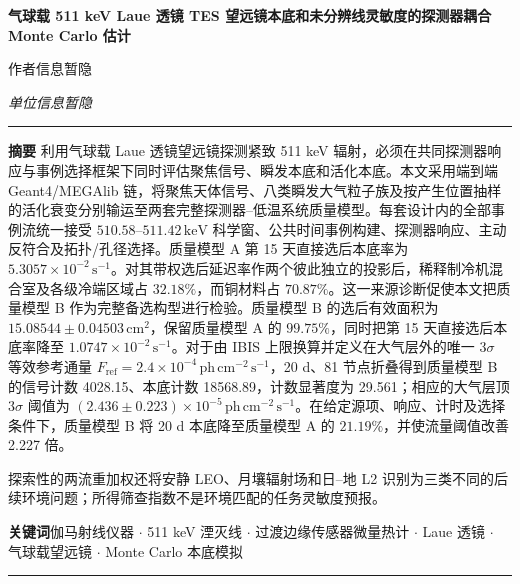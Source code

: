 \documentclass[11pt]{article}
\newcommand{\revblue}[1]{\textcolor{revisionblue}{#1}}
\newcommand{\keV}{\,\mathrm{keV}}
\newcommand{\phcms}{\,\mathrm{ph\,cm^{-2}\,s^{-1}}}
\newcommand{\cps}{\,\mathrm{s^{-1}}}
\newcommand{\fref}{F_{\mathrm{ref}}}
\begin{document}
\thispagestyle{fancy}
\begin{flushleft}
{\LARGE\bfseries 气球载 511 keV Laue 透镜 TES 望远镜本底和未分辨线灵敏度的探测器耦合 Monte Carlo 估计 \par}
\vspace{1.1em}
{\large 作者信息暂隐\par}
\vspace{0.3em}
{\normalsize\itshape 单位信息暂隐\par}
\end{flushleft}
\vspace{0.7em}
\noindent\rule{\textwidth}{0.4pt}
\vspace{0.5em}

\noindent\textbf{摘要}\hspace{0.7em}
利用气球载 Laue 透镜望远镜探测紧致 511 keV 辐射，必须在共同探测器响应与事例选择框架下同时评估聚焦信号、瞬发本底和活化本底。本文采用端到端 Geant4/MEGAlib 链，将聚焦天体信号、\revblue{八类瞬发大气粒子族}及按产生位置抽样的活化衰变分别输运至两套完整探测器--低温系统质量模型。每套设计内的全部事例流统一接受 $510.58$--$511.42\keV$ 科学窗、公共时间事例构建、探测器响应、主动反符合及拓扑/孔径选择。质量模型 A 第 15 天直接选后本底率为 $5.3057\times10^{-2}\cps$。对其带权选后延迟率作两个彼此独立的投影后，稀释制冷机混合室及各级冷端区域占 $32.18\%$，而铜材料占 $70.87\%$。这一来源诊断促使本文把质量模型 B 作为完整备选构型进行检验。质量模型 B 的选后有效面积为 $15.08544\pm0.04503\,\mathrm{cm^2}$，保留质量模型 A 的 $99.75\%$，同时把第 15 天直接选后本底率降至 $1.0747\times10^{-2}\cps$。对于由 IBIS 上限换算并定义在大气层外的唯一 $3\sigma$ 等效参考通量 $\fref=2.4\times10^{-4}\phcms$，20 d、81 节点折叠得到质量模型 B 的信号计数 4028.15、本底计数 18568.89，计数显著度为 29.561；相应的大气层顶 $3\sigma$ 阈值为 $(2.436\pm0.223)\times10^{-5}\phcms$。在给定源项、响应、计时及选择条件下，质量模型 B 将 20 d 本底降至质量模型 A 的 $21.19\%$，并使流量阈值改善 2.227 倍。

探索性的两流重加权还将安静 LEO、月壤辐射场和日--地 L2 识别为三类不同的后续环境问题；所得筛查指数不是环境匹配的任务灵敏度预报。

\vspace{0.7em}
\noindent\textbf{关键词}\hspace{0.7em}伽马射线仪器 $\cdot$ 511 keV 湮灭线 $\cdot$ 过渡边缘传感器微量热计 $\cdot$ Laue 透镜 $\cdot$ 气球载望远镜 $\cdot$ Monte Carlo 本底模拟

\vspace{0.3em}
\noindent\rule{\textwidth}{0.4pt}
\vspace{1.0em}
\end{document}
